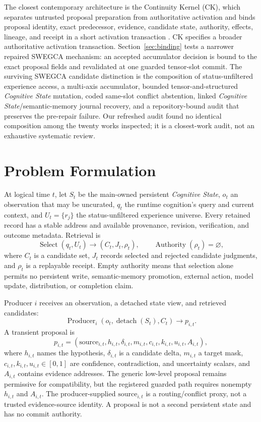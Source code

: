 \documentclass[10pt]{article}
\newcommand{\swegca}{\textsc{SWEGCA}}
\newcommand{\cstate}{\textit{Cognitive State}}
\begin{document}
The closest contemporary architecture is the Continuity Kernel (CK), which separates untrusted proposal preparation from authoritative activation and binds proposal identity, exact predecessor, evidence, candidate state, authority, effects, lineage, and receipt in a short activation transaction \cite{he2026continuity}. CK specifies a broader authoritative activation transaction. Section~\ref{sec:binding} tests a narrower repaired \swegca{} mechanism: an accepted accumulator decision is bound to the exact proposal fields and revalidated at one guarded tensor-slot commit. The surviving \swegca{} candidate distinction is the composition of status-unfiltered experience access, a multi-axis accumulator, bounded tensor-and-structured \cstate{} mutation, coded same-slot conflict abstention, linked \cstate/semantic-memory journal recovery, and a repository-bound audit that preserves the pre-repair failure. Our refreshed audit found no identical composition among the twenty works inspected; it is a closest-work audit, not an exhaustive systematic review.

\section{Problem Formulation}

At logical time $t$, let $S_t$ be the main-owned persistent \cstate, $o_t$ an observation that may be uncurated, $q_t$ the runtime cognition's query and current context, and $U_t=\{r_j\}$ the status-unfiltered experience universe. Every retained record has a stable address and available provenance, revision, verification, and outcome metadata. Retrieval is
\begin{equation}
  \operatorname{Select}(q_t,U_t)\rightarrow(C_t,J_t,\rho_t),
  \qquad \operatorname{Authority}(\rho_t)=\varnothing,
\end{equation}
where $C_t$ is a candidate set, $J_t$ records selected and rejected candidate judgments, and $\rho_t$ is a replayable receipt. Empty authority means that selection alone permits no persistent write, semantic-memory promotion, external action, model update, distribution, or completion claim.

Producer $i$ receives an observation, a detached state view, and retrieved candidates:
\begin{equation}
  \operatorname{Producer}_i(o_t,\operatorname{detach}(S_t),C_t)\rightarrow p_{i,t}.
\end{equation}
A transient proposal is
\begin{equation}
  p_{i,t}=(\mathrm{source}_{i,t},h_{i,t},\delta_{i,t},m_{i,t},c_{i,t},k_{i,t},u_{i,t},A_{i,t}),
\end{equation}
where $h_{i,t}$ names the hypothesis, $\delta_{i,t}$ is a candidate delta, $m_{i,t}$ a target mask, $c_{i,t},k_{i,t},u_{i,t}\in[0,1]$ are confidence, contradiction, and uncertainty scalars, and $A_{i,t}$ contains evidence addresses. The generic low-level proposal remains permissive for compatibility, but the registered guarded path requires nonempty $h_{i,t}$ and $A_{i,t}$. The producer-supplied $\mathrm{source}_{i,t}$ is a routing/conflict proxy, not a trusted evidence-source identity. A proposal is not a second persistent state and has no commit authority.
\end{document}
